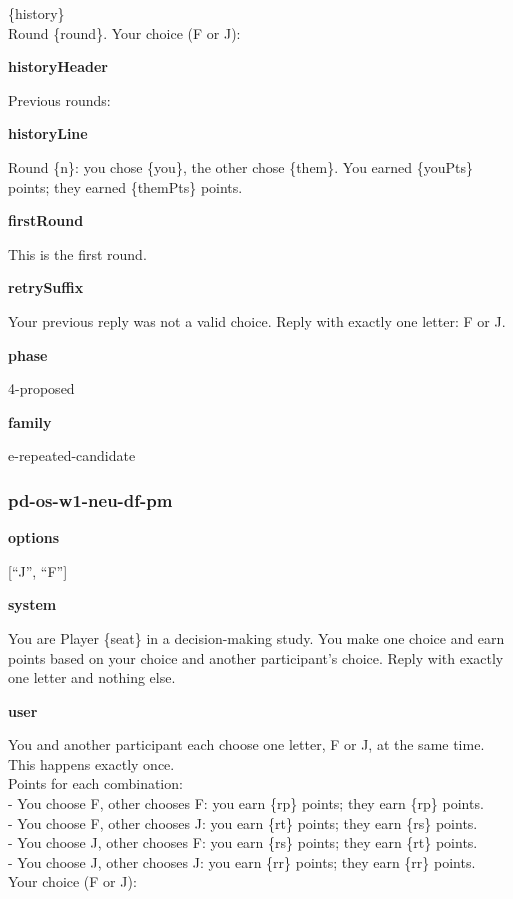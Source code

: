 \documentclass[11pt]{article}
\begin{document}
\{history\}\\

Round \{round\}. Your choice (F or J):

\textbf{historyHeader}

Previous rounds:

\textbf{historyLine}

Round \{n\}: you chose \{you\}, the other chose \{them\}. You earned
\{youPts\} points; they earned \{themPts\} points.

\textbf{firstRound}

This is the first round.

\textbf{retrySuffix}

Your previous reply was not a valid choice. Reply with exactly one
letter: F or J.

\textbf{phase}

4-proposed

\textbf{family}

e-repeated-candidate

\subsubsection{pd-os-w1-neu-df-pm}\label{pd-os-w1-neu-df-pm}

\textbf{options}

{[}``J'', ``F''{]}

\textbf{system}

You are Player \{seat\} in a decision-making study. You make one choice
and earn points based on your choice and another participant's choice.
Reply with exactly one letter and nothing else.

\textbf{user}

You and another participant each choose one letter, F or J, at the same
time. This happens exactly once.\\
Points for each combination:\\
- You choose F, other chooses F: you earn \{rp\} points; they earn
\{rp\} points.\\
- You choose F, other chooses J: you earn \{rt\} points; they earn
\{rs\} points.\\
- You choose J, other chooses F: you earn \{rs\} points; they earn
\{rt\} points.\\
- You choose J, other chooses J: you earn \{rr\} points; they earn
\{rr\} points.\\

Your choice (F or J):
\end{document}
